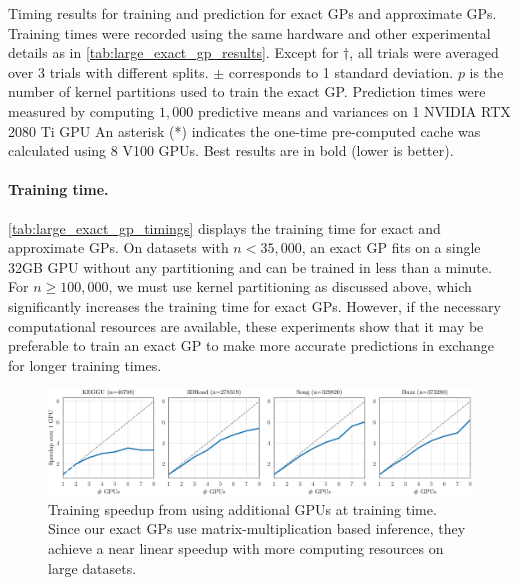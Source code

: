 \begin{table}[t!]
  \caption{
    Timing results for training and prediction for exact GPs and approximate GPs.
    Training times were recorded using the same hardware and other experimental details as in \cref{tab:large_exact_gp_results}.
    Except for $\dagger$, all trials were averaged over 3 trials with different splits.  $\pm$ corresponds to 1 standard deviation.
	$p$ is the number of kernel partitions used to train the exact GP.
	Prediction times were measured by computing $1,\!000$ predictive means
	and variances on 1 NVIDIA RTX 2080 Ti GPU
    An asterisk (*) indicates the one-time pre-computed cache was calculated using 8 V100 GPUs.
    Best results are in bold (lower is better).
  }
  \label{tab:large_exact_gp_timings}
  \centering
  \resizebox{\textwidth}{!}{%
    
  }
\end{table}


\paragraph{Training time.}
\cref{tab:large_exact_gp_timings} displays the training time for exact and approximate GPs.
On datasets with $n < 35,\!000$, an exact GP fits on a
single 32GB GPU without any partitioning and can be trained in less than a minute.
For $n \geq 100,\!000$, we must use kernel partitioning as discussed above, which significantly increases the
training time for exact GPs. However, if the necessary computational
resources are available, these experiments show that it may be preferable to
train an exact GP to make more accurate predictions in exchange for longer training times.

\begin{figure}[ht!]
  \centering
  \includegraphics[width=\linewidth]{figures/gpu_speedup.pdf}
  \caption{
    Training speedup from using additional GPUs at training time.
    Since our exact GPs use matrix-multiplication based inference, they achieve a near linear speedup with more computing resources on large datasets.
  }
  \label{fig:gpu_speedup}
\end{figure}


